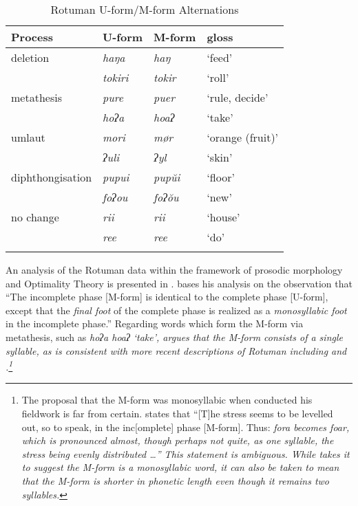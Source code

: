 \begin{table}[h]
	\caption{Rotuman U-form/M-form Alternations}\label{tab:RotPhaAlt}
	\centering
		\begin{tabular}{llll}\lsptoprule
				Process 			& U-form	 		& M-form			& gloss \\ \midrule
				deletion			&	\it{haŋa}		& \it{haŋ}		& `feed'	\\
											&	\it{tokiri}	& \it{tokir}	& `roll'	\\
				metathesis		&	\it{pure}		& \it{puer} 	& `rule, decide'	\\
											&	\it{hoʔa}		& \it{hoaʔ} 	& `take'	\\
				umlaut				&	\it{mori}		& \it{mør} 		& `orange (fruit)'	\\
											&	\it{ʔuli}		& \it{ʔyl} 		& `skin'	\\
		diphthongisation	&	\it{pupui}	& \it{pupŭi}	& `floor'	\\
											&	\it{foʔou}	& \it{foʔŏu}	& `new'	\\
					no change		&	\it{rii}		& \it{rii} 		& `house'	\\
											&	\it{ree}		& \it{ree}		& `do'	\\
											\lspbottomrule
		\end{tabular}
\end{table}

An analysis of the Rotuman data within the framework of
prosodic morphology and Optimality Theory \citep{prsm93}
is presented in \cite{mcc00}.
\citet[159]{mcc00} bases his analysis on the observation that
{``The incomplete phase [M-form] is identical to the complete phase [U-form],
except that the \emph{final foot} of the complete phase is realized as a
\emph{monosyllabic foot} in the incomplete phase.''}
Regarding words which form the M-form
via metathesis, such as \it{hoʔa} {\ra} \it{hoaʔ} `take',
\cite{mcc00} argues that the M-form consists of a single syllable,
as is consistent with more recent descriptions of Rotuman including \cite{be87} and \cite{va02}.\footnote{\label{fn:Problem1}
		The proposal that the M-form was monosyllabic when \cite{ch40}
		conducted his fieldwork is far from certain.
		\citet[86]{ch40} states that
		``[T]he stress seems to be levelled out, so to speak,
		in the inc[omplete] phase [M-form]. Thus: \it{fo}ra becomes \it{foar},
		which is pronounced almost, though perhaps not quite, as one syllable,
		the stress being evenly distributed {\ldots}''
		This statement is ambiguous.
		While \cite{mcc00} takes it to suggest the M-form
		is a monosyllabic word, it can also be taken
		to mean that the M-form is shorter in phonetic length
		even though it remains two syllables.}

